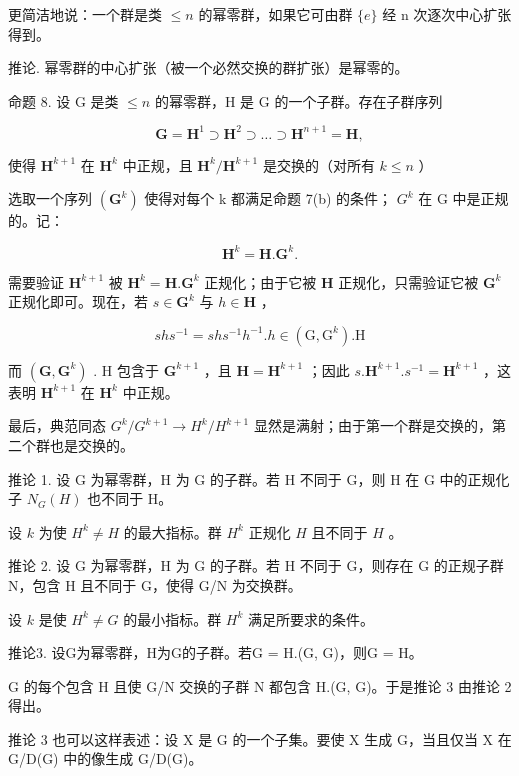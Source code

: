更简洁地说：一个群是类 \(\leqslant n\) 的幂零群，如果它可由群 \(\{e\}\) 经 n 次逐次中心扩张得到。

推论. 幂零群的中心扩张（被一个必然交换的群扩张）是幂零的。

命题 8. 设 G 是类 \(\leqslant n\) 的幂零群，H 是 G 的一个子群。存在子群序列

\[
\mathbf {G} = \mathbf {H} ^ {1} \supset \mathbf {H} ^ {2} \supset \dots \supset \mathbf {H} ^ {n + 1} = \mathbf {H},
\]

使得 \(\mathbf{H}^{k + 1}\) 在 \(\mathbf{H}^k\) 中正规，且 \(\mathbf{H}^k /\mathbf{H}^{k + 1}\) 是交换的（对所有 \(k\leqslant n\) ）

选取一个序列 \((\mathbf{G}^{k})\) 使得对每个 k 都满足命题 7(b) 的条件； \(G^{k}\) 在 G 中是正规的。记：

\[
\mathbf {H} ^ {k} = \mathbf {H}. \mathbf {G} ^ {k}.
\]

需要验证 \(\mathbf{H}^{k + 1}\) 被 \(\mathbf{H}^k = \mathbf{H}.\mathbf{G}^k\) 正规化；由于它被 \(\mathbf{H}\) 正规化，只需验证它被 \(\mathbf{G}^k\) 正规化即可。现在，若 \(s\in \mathbf{G}^k\) 与 \(h\in \mathbf{H}\) ，

\[
s h s ^ {- 1} = s h s ^ {- 1} h ^ {- 1}. h \in (\mathrm{G}, \mathrm{G} ^ {k}). \mathrm{H}
\]

而 \((\mathbf{G},\mathbf{G}^k)\) . H 包含于 \(\mathbf{G}^{k + 1}\) ，且 \(\mathbf{H} = \mathbf{H}^{k + 1}\) ；因此 \(s.\mathbf{H}^{k + 1}.s^{-1} = \mathbf{H}^{k + 1}\) ，这表明 \(\mathbf{H}^{k + 1}\) 在 \(\mathbf{H}^k\) 中正规。

最后，典范同态 \(G^{k}/G^{k+1} \to H^{k}/H^{k+1}\) 显然是满射；由于第一个群是交换的，第二个群也是交换的。

推论 1. 设 G 为幂零群，H 为 G 的子群。若 H 不同于 G，则 H 在 G 中的正规化子 \(N_{G}(H)\) 也不同于 H。

设 \(k\) 为使 \(H^{k} \neq H\) 的最大指标。群 \(H^{k}\) 正规化 \(H\) 且不同于 \(H\) 。

推论 2. 设 G 为幂零群，H 为 G 的子群。若 H 不同于 G，则存在 G 的正规子群 N，包含 H 且不同于 G，使得 G/N 为交换群。

设 \(k\) 是使 \(H^k \neq G\) 的最小指标。群 \(H^k\) 满足所要求的条件。

推论3. 设G为幂零群，H为G的子群。若G = H.(G, G)，则G = H。

G 的每个包含 H 且使 G/N 交换的子群 N 都包含 H.(G, G)。于是推论 3 由推论 2 得出。

推论 3 也可以这样表述：设 X 是 G 的一个子集。要使 X 生成 G，当且仅当 X 在 G/D(G) 中的像生成 G/D(G)。

